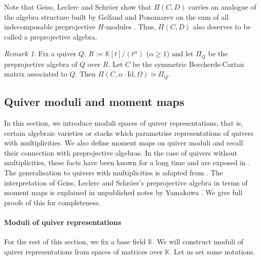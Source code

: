 \documentclass[11pt,english]{article}
\numberwithin{equation}{section}
\numberwithin{figure}{section}
\theoremstyle{definition}
\theoremstyle{plain}
\theoremstyle{remark}
\newtheorem{rmk}[df]{Remark}
\newcommand\KK{\mathbb{K}}
\begin{document}
Note that Geiss, Leclerc and Schröer show that $\Pi(C,D)$ carries
an analogue of the algebra structure built by Gelfand and Ponomarev
on the sum of all indecomposable preprojective $H$-modules \cite[Thm. 1.6.]{GLS17a}.
Thus, $\Pi(C,D)$ also deserves to be called a preprojective algebra.

\begin{rmk}

Fix a quiver $Q$, $R:=\KK[t]/(t^{\alpha})$ ($\alpha\geq1$) and
let $\Pi_{Q}$ be the preprojective algebra of $Q$ over $R$. Let
$C$ be the symmetric Borcherds-Cartan matrix associated to $Q$.
Then $\Pi(C,\alpha\cdot\mathrm{Id},\Omega)\simeq\Pi_{Q}$.

\end{rmk}

\subsection{Quiver moduli and moment maps \label{Subsect/MomMap}}

In this section, we introduce moduli spaces of quiver representations,
that is, certain algebraic varieties or stacks which parametrise representations
of quivers with multiplicities. We also define moment maps on quiver
moduli and recall their connection with preprojective algebras. In
the case of quivers without multiplicities, these facts have been
known for a long time and are exposed in \cite{CB99a,Rei08a}. The
generalisation to quivers with multiplicities is adapted from \cite{GLS16,GLS18a}.
The interpretation of Geiss, Leclerc and Schröer's preprojective algebra
in terms of moment maps is explained in unpublished notes by Yamakawa
\cite{Yam}. We give full proofs of this for completeness.

\paragraph*{Moduli of quiver representations}

For the rest of this section, we fix a base field $\KK$. We will
construct moduli of quiver representations from spaces of matrices
over $\KK$. Let us set some notations.
\end{document}
